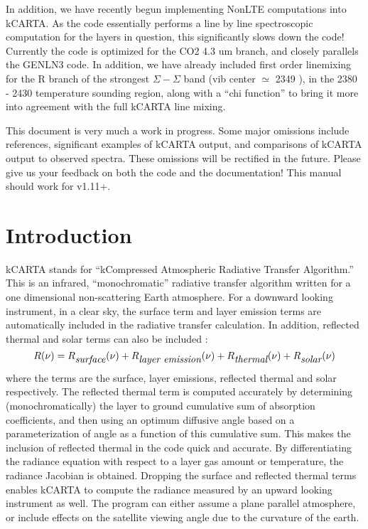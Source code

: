 \documentclass[12pt]{article}
\newcommand{\kc}{\textsf{kCARTA}\xspace}
\begin{document}
In addition, we have recently begun implementing NonLTE computations into \kc.
As the code essentially performs a line by line spectroscopic computation for
the layers in question, this significantly slows down the code! Currently the
code is optimized for the CO2 4.3 um branch, and closely parallels the GENLN3
code. In addition, we have already included first order linemixing for the R 
branch of the strongest $\Sigma-\Sigma$ band (vib center $\simeq$ 2349 \wn), 
in the 2380 - 2430 \wn temperature sounding region, along with a 
``chi function'' to bring it more into agreement with the full  kCARTA line
mixing.

This document is very much a work in progress.  Some major omissions
include references, significant examples of \kc output, and
comparisons of \kc output to observed spectra.  These omissions will
be rectified in the future.  Please give us your feedback on both the
code and the documentation!  This manual should work for v1.11+.

\newpage
\section{Introduction}

\kc stands for ``kCompressed Atmospheric Radiative Transfer
Algorithm.''  This is an infrared, ``monochromatic'' radiative
transfer algorithm written for a one dimensional non-scattering Earth
atmosphere.  For a downward looking instrument, in a clear sky, 
the surface term and layer emission terms are automatically included in the 
radiative transfer calculation.  In addition, reflected thermal and solar 
terms can also be included :
\begin{equation}
R(\nu) = R_{\hbox{\it surface}}(\nu) + R_{\hbox{\it layer emission}}(\nu) + 
R_{\hbox{\it thermal}}(\nu) + R_{\hbox{\it solar}}(\nu)
\end{equation}
where the terms are the surface, layer emissions, reflected thermal
and solar respectively.  The reflected thermal term is computed
accurately by determining (monochromatically) the layer to ground
cumulative sum of absorption coefficients, and then using an optimum
diffusive angle based on a parameterization of angle as a function of
this cumulative sum.  This makes the inclusion of reflected thermal in
the code quick and accurate.   By differentiating the radiance equation
with respect to a layer gas amount or temperature, the radiance
Jacobian is obtained.  Dropping the surface and reflected thermal terms
enables \kc to compute the radiance measured by an upward looking
instrument as well.  The program can either assume a plane parallel
atmosphere, or include effects on the satellite viewing angle due to
the curvature of the earth.
\end{document}
